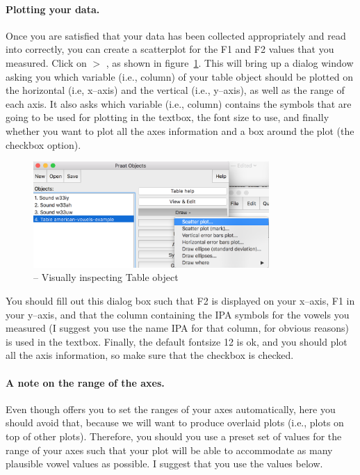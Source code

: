 \paragraph{Plotting your data.} Once you are satisfied that your data has been collected appropriately and read into \Praat{} correctly, you can create a scatterplot for the F1 and F2 values that you measured. Click on  $>$ , as shown in figure~\ref{praat-scatterplot-vowels}. This will bring up a dialog window asking you which variable (i.e., column) of your table object should be plotted on the horizontal (i.e, x--axis) and the vertical (i.e., y--axis), as well as the range of each axis. It also asks which variable (i.e., column) contains the symbols that are going to be used for plotting in the  textbox, the font size to use, and finally whether you want to plot all the axes information and a box around the plot (the  checkbox option).

\begin{figure}[!tbp]
\caption{\Praat{} -- Visually inspecting Table object}
\label{praat-scatterplot-vowels}
	\begin{center}
		\includegraphics[width=0.8\textwidth]{./figures/Praat-14-Scatterplot-01}
	\end{center}
\end{figure}

You should fill out this dialog box such that F2 is displayed on your x--axis, F1 in your y--axis, and that the column containing the IPA symbols for the vowels you measured (I suggest you use the name IPA for that column, for obvious reasons) is used in the  textbox. Finally, the default fontsize 12 is ok, and you should plot all the axis information, so make sure that the  checkbox is checked.

\paragraph{A note on the range of the axes.} Even though \Praat{} offers you to set the ranges of your axes automatically, here you should avoid that, because we will want to produce overlaid plots (i.e., plots on top of other plots). Therefore, you should you use a preset set of values for the range of your axes such that your plot will be able to accommodate as many plausible vowel values as possible. I suggest that you use the values below.

